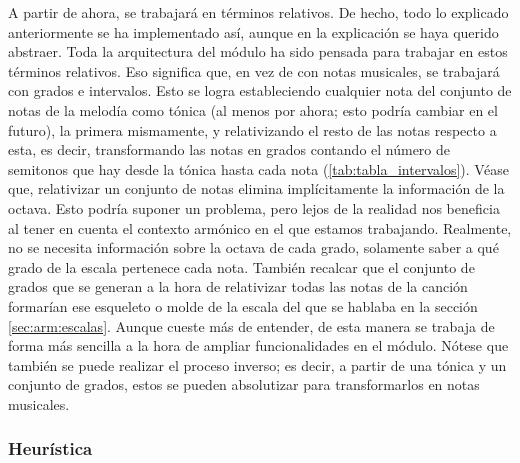     A partir de ahora, se trabajará en términos relativos. De hecho, todo lo explicado anteriormente se ha implementado así, aunque en la explicación se haya querido abstraer. Toda la arquitectura del módulo ha sido pensada para trabajar en estos términos relativos. Eso significa que, en vez de con notas musicales, se trabajará con grados e intervalos. Esto se logra estableciendo cualquier nota del conjunto de notas de la melodía como tónica (al menos por ahora; esto podría cambiar en el futuro), la primera mismamente, y relativizando el resto de las notas respecto a esta, es decir, transformando las notas en grados contando el número de semitonos que hay desde la tónica hasta cada nota (\ref{tab:tabla_intervalos}). Véase que, relativizar un conjunto de notas elimina implícitamente la información de la octava. Esto podría suponer un problema, pero lejos de la realidad nos beneficia al tener en cuenta el contexto armónico en el que estamos trabajando. Realmente, no se necesita  información sobre la octava de cada grado, solamente saber a qué grado de la escala pertenece cada nota. También recalcar que el conjunto de grados que se generan a la hora de relativizar todas las notas de la canción formarían ese esqueleto o molde de la escala del que se hablaba en la sección \ref{sec:arm:escalas}. Aunque cueste más de entender, de esta manera se trabaja de forma más sencilla a la hora de ampliar funcionalidades en el módulo. Nótese que también se puede realizar el proceso inverso; es decir, a partir de una tónica y un conjunto de grados, estos se pueden absolutizar para transformarlos en notas musicales.

\subsubsection{Heurística} 

    

    

    


    